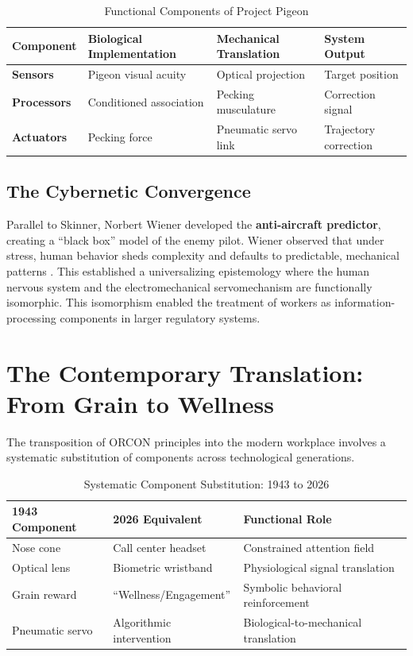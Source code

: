 \documentclass[11pt, a4paper]{article}
\begin{document}
\begin{table}[h]
\centering
\caption{Functional Components of Project Pigeon}
\label{tab:pigeon_components}
\begin{tabular}{@{}llll@{}}
\toprule
\textbf{Component} & \textbf{Biological Implementation} & \textbf{Mechanical Translation} & \textbf{System Output} \\ \midrule
\textbf{Sensors} & Pigeon visual acuity & Optical projection & Target position \\
\textbf{Processors} & Conditioned association & Pecking musculature & Correction signal \\
\textbf{Actuators} & Pecking force & Pneumatic servo link & Trajectory correction \\ \bottomrule
\end{tabular}
\end{table}

\subsection{The Cybernetic Convergence}
Parallel to Skinner, Norbert Wiener developed the \textbf{anti-aircraft predictor}, creating a ``black box'' model of the enemy pilot. Wiener observed that under stress, human behavior sheds complexity and defaults to predictable, mechanical patterns \cite{wiener1948cybernetics}. This established a universalizing epistemology where the human nervous system and the electromechanical servomechanism are functionally isomorphic. This isomorphism enabled the treatment of workers as information-processing components in larger regulatory systems.

\section{The Contemporary Translation: From Grain to Wellness}

The transposition of ORCON principles into the modern workplace involves a systematic substitution of components across technological generations.

\begin{table}[h]
\centering
\caption{Systematic Component Substitution: 1943 to 2026}
\label{tab:substitution}
\begin{tabular}{@{}lll@{}}
\toprule
\textbf{1943 Component} & \textbf{2026 Equivalent} & \textbf{Functional Role} \\ \midrule
Nose cone & Call center headset & Constrained attention field \\
Optical lens & Biometric wristband & Physiological signal translation \\
Grain reward & ``Wellness/Engagement'' & Symbolic behavioral reinforcement \\
Pneumatic servo & Algorithmic intervention & Biological-to-mechanical translation \\ \bottomrule
\end{tabular}
\end{table}
\end{document}
